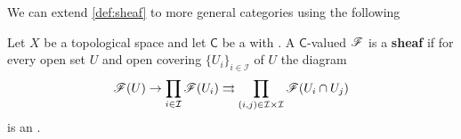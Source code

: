\documentclass[../main.tex]{subfiles}
\begin{document}
We can extend \autoref{def:sheaf} to more general categories using the following
\begin{definition}[Sheaf]
  Let \(X\) be a topological space and let \(\mathsf{C}\) be a  with .
  A \(\mathsf{C}\)-valued  \(\mathscr{F}\) is a \textbf{sheaf} if for every open set \(U\) and open covering \(\{U_{i}\}_{i \in \mathcal{I}}\) of \(U\) the diagram
  \begin{equation} \label{diagram:sheaf}
    \mathscr{F}(U) \rightarrow \prod_{i \in \mathcal{I}} \mathscr{F}(U_{i}) \rightrightarrows \prod_{(i, j) \in \mathcal{I} \times \mathcal{I}} \mathscr{F}(U_{i} \cap U_{j})
  \end{equation}
  is an .
\end{definition}
\end{document}
